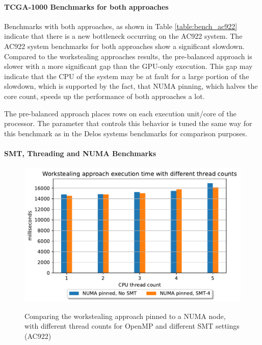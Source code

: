 \paragraph{TCGA-1000 Benchmarks for both approaches}


Benchmarks with both approaches, as shown in Table \ref{table:bench_ac922} indicate that there is a new bottleneck occurring on the AC922 system. The AC922 system benchmarks for both approaches show a significant slowdown. Compared to the workstealing approaches results, the pre-balanced approach is slower with a more significant gap than the GPU-only execution. This gap may indicate that the CPU of the system may be at fault for a large portion of the slowdown, which is supported by the fact, that NUMA pinning, which halves the core count, speeds up the performance of both approaches a lot.

The pre-balanced approach places rows on each execution unit/core of the processor. The parameter that controls this behavior is tuned the same way for this benchmark as in the Delos systems benchmarks for comparison purposes.


\paragraph{SMT, Threading and NUMA Benchmarks}
\begin{figure}[H]
  \caption{Comparing the workstealing approach pinned to a NUMA node, with different thread counts for OpenMP and different SMT settings (AC922)}
  \includegraphics[width=\textwidth]{figures/ac922_threadcount.pdf}
  \centering
  \label{fig:threadcount_ac922}
\end{figure}

